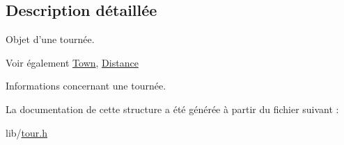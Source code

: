\subsection{Description détaillée}
Objet d'une tournée. \begin{DoxySeeAlso}{Voir également}
\hyperlink{structTown}{Town}, \hyperlink{structDistance}{Distance}
\end{DoxySeeAlso}
Informations concernant une tournée. 

La documentation de cette structure a été générée à partir du fichier suivant :\begin{DoxyCompactItemize}
\item 
lib/\hyperlink{tour_8h}{tour.h}\end{DoxyCompactItemize}
